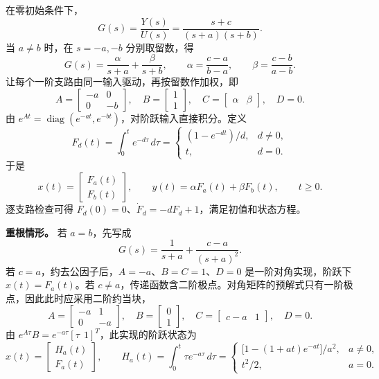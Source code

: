 
\sol 在零初始条件下，
\[
    G(s)=\frac{Y(s)}{U(s)}=\frac{s+c}{(s+a)(s+b)}.
\]
当 $a\ne b$ 时，在 $s=-a,-b$ 分别取留数，得
\[
    G(s)=\frac{\alpha}{s+a}+\frac{\beta}{s+b},\qquad
    \alpha=\frac{c-a}{b-a},\qquad \beta=\frac{c-b}{a-b}.
\]
让每个一阶支路由同一输入驱动，再按留数作加权，即
\[
    \boxed{
    A=\begin{bmatrix}-a&0\\0&-b\end{bmatrix},\quad
    B=\begin{bmatrix}1\\1\end{bmatrix},\quad
    C=\begin{bmatrix}\alpha&\beta\end{bmatrix},\quad D=0.}
\]
由 $e^{At}=\operatorname{diag}(e^{-at},e^{-bt})$，对阶跃输入直接积分。定义
\[
    F_d(t)=\int_0^t e^{-d\tau}\,d\tau
    =\begin{cases}
        (1-e^{-dt})/d,& d\ne 0,\\
        t,& d=0.
    \end{cases}
\]
于是
\[
    \boxed{x(t)=\begin{bmatrix}F_a(t)\\F_b(t)\end{bmatrix}},\qquad
    y(t)=\alpha F_a(t)+\beta F_b(t),\qquad t\geq0.
\]
逐支路检查可得 $F_d(0)=0$、$\dot F_d=-dF_d+1$，满足初值和状态方程。

\textbf{重根情形。} 若 $a=b$，先写成
\[
    G(s)=\frac{1}{s+a}+\frac{c-a}{(s+a)^2}.
\]
若 $c=a$，约去公因子后，$A=-a$、$B=C=1$、$D=0$ 是一阶对角实现，阶跃下 $x(t)=F_a(t)$。若 $c\ne a$，传递函数含二阶极点。对角矩阵的预解式只有一阶极点，因此此时应采用二阶约当块，
\[
    A=\begin{bmatrix}-a&1\\0&-a\end{bmatrix},\quad
    B=\begin{bmatrix}0\\1\end{bmatrix},\quad
    C=\begin{bmatrix}c-a&1\end{bmatrix},\quad D=0.
\]
由 $e^{A\tau}B=e^{-a\tau}[\tau\ \ 1]^T$，此实现的阶跃状态为
\[
    x(t)=\begin{bmatrix}H_a(t)\\F_a(t)\end{bmatrix},\qquad
    H_a(t)=\int_0^t \tau e^{-a\tau}\,d\tau
    =\begin{cases}
        \bigl[1-(1+at)e^{-at}\bigr]/a^2,&a\ne0,\\
        t^2/2,&a=0.
    \end{cases}
\]
